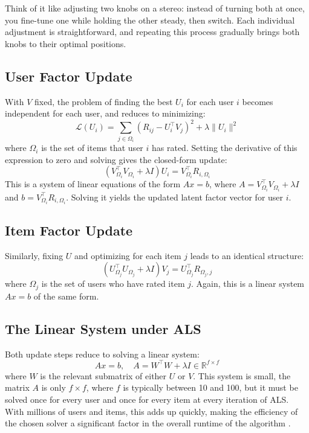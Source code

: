 \documentclass[12pt,a4paper]{report}
\begin{document}
Think of it like adjusting two knobs on a stereo: instead of turning both at once, you fine-tune one while holding the other steady, then switch. Each individual adjustment is straightforward, and repeating this process gradually brings both knobs to their optimal positions.

\subsection*{User Factor Update}

With \( V \) fixed, the problem of finding the best \( U_i \) for each user \( i \) becomes independent for each user, and reduces to minimizing:
\[
    \mathcal{L}(U_i) = \sum_{j \in \Omega_i} \left( R_{ij} - U_i^\top V_j \right)^2
    + \lambda \|U_i\|^2
\]
where \( \Omega_i \) is the set of items that user \( i \) has rated. Setting the derivative of this expression to zero and solving gives the closed-form update:
\[
    \left( V_{\Omega_i}^\top V_{\Omega_i} + \lambda I \right) U_i =
    V_{\Omega_i}^\top R_{i,\Omega_i}
\]
This is a system of linear equations of the form \( Ax = b \), where \( A = V_{\Omega_i}^\top V_{\Omega_i} + \lambda I \) and \( b = V_{\Omega_i}^\top R_{i,\Omega_i} \). Solving it yields the updated latent factor vector for user \( i \).

\subsection*{Item Factor Update}

Similarly, fixing \( U \) and optimizing for each item \( j \) leads to an identical structure:
\[
    \left( U_{\Omega_j}^\top U_{\Omega_j} + \lambda I \right) V_j =
    U_{\Omega_j}^\top R_{\Omega_j,j}
\]
where \( \Omega_j \) is the set of users who have rated item \( j \). Again, this is a linear system \( Ax = b \) of the same form.

\subsection*{The Linear System under ALS}

Both update steps reduce to solving a linear system:
\[
    Ax = b, \quad A = W^\top W + \lambda I \in \mathbb{R}^{f \times f}
\]
where \( W \) is the relevant submatrix of either \( U \) or \( V \). This system is small, the matrix \( A \) is only \( f \times f \), where \( f \) is typically between 10 and 100, but it must be solved once for every user and once for every item at every iteration of ALS. With millions of users and items, this adds up quickly, making the efficiency of the chosen solver a significant factor in the overall runtime of the algorithm \parencite{takacs2009scalable}.
\end{document}
